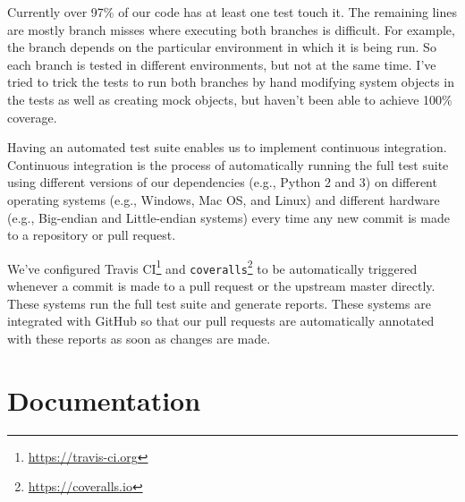 Currently over 97\% of our code has at least one test touch it.  The remaining
lines are mostly branch misses where executing both branches is difficult.  For
example, the branch depends on the particular environment in which it is being
run. So each branch is tested in different environments, but not at the same
time.  I've tried to trick the tests to run both branches by hand modifying
system objects in the tests as well as creating mock objects, but haven't been
able to achieve 100\% coverage.


Having an automated test suite enables us to implement continuous integration.
Continuous integration is the process of automatically running the full test
suite using different versions of our dependencies (e.g., Python 2 and 3) on
different operating systems (e.g., Windows, Mac OS, and Linux) and different
hardware (e.g., Big-endian and Little-endian systems) every time any new commit
is made to a repository or pull request.

We've configured Travis CI\footnote{\url{https://travis-ci.org}} and
\texttt{coveralls}\footnote{\url{https://coveralls.io}} to be automatically
triggered whenever a commit is made to a pull request or the upstream
master directly.  These systems run the full test suite and generate reports.
These systems are integrated with GitHub so that our pull requests are
automatically annotated with these reports as soon as changes are made.

%
%
%
%
%
%

\section{\label{sec:doc}Documentation}

